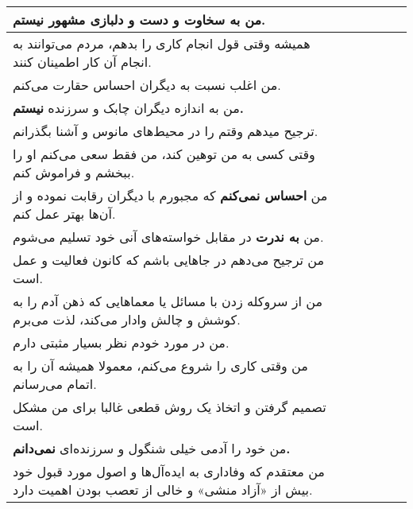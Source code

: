 \documentclass[a4paper,10pt]{article}
\begin{document}
\begin{center}
\begin{tabular}{|p{6cm}|c|c|c|c|c|}
من به سخاوت و دست و دلبازی \textbf{مشهور نیستم.}& & & & & \\
\hline


همیشه وقتی قول انجام کاری را بدهم، مردم می‌توانند به انجام آن کار اطمینان کنند.& & & & & \\
\hline


من اغلب نسبت به دیگران احساس حقارت می‌کنم.& & & & & \\
\hline


من به اندازه دیگران چابک و سرزنده \textbf{نیستم.}& & & & & \\
\hline


ترجیح میدهم وقتم را در محیط‌های مانوس و آشنا بگذرانم.& & & & & \\
\hline


وقتی کسی به من توهین کند، من فقط سعی می‌کنم او را ببخشم و فراموش کنم.& & & & & \\
\hline


من \textbf{احساس نمی‌کنم} که مجبورم با دیگران رقابت نموده و از آن‌ها بهتر عمل کنم.& & & & & \\
\hline


من  \textbf{به ندرت} در مقابل خواسته‌های آنی خود تسلیم می‌شوم.& & & & & \\
\hline


من ترجیح می‌دهم در جاهایی باشم که کانون فعالیت و عمل است.& & & & & \\
\hline


من از سروکله زدن با مسائل یا معماهایی که ذهن آدم را به کوشش و چالش وادار می‌کند، لذت می‌برم.& & & & & \\
\hline


من در مورد خودم نظر بسیار مثبتی دارم.& & & & & \\
\hline


من وقتی کاری را شروع می‌کنم، معمولا همیشه آن را به اتمام می‌رسانم.& & & & & \\
\hline


تصمیم گرفتن و اتخاذ یک روش قطعی غالبا برای من مشکل است.& & & & & \\
\hline


من خود را آدمی خیلی شنگول و سرزنده‌ای \textbf{نمی‌دانم.}& & & & & \\
\hline


من معتقدم که وفاداری به ایده‌آل‌ها و اصول مورد قبول خود بیش از «آزاد منشی» و خالی از تعصب بودن اهمیت دارد.& & & & & \\
\hline


\end{tabular}
\end{center}
\end{document}
